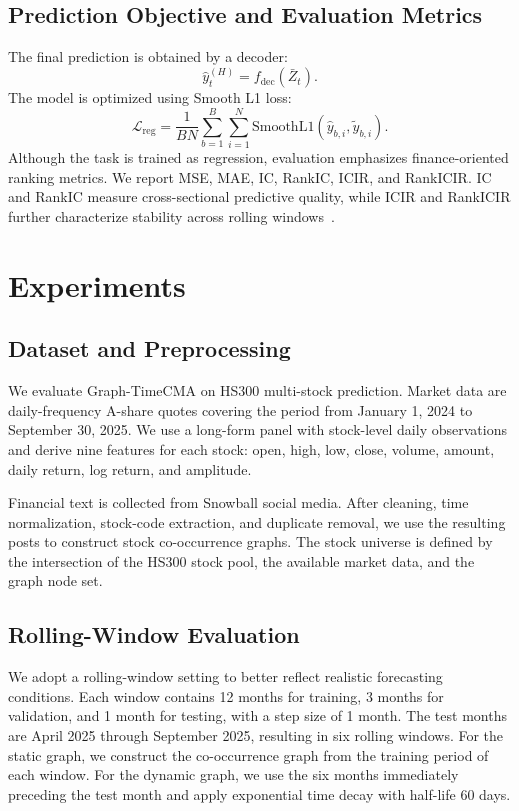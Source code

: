 \documentclass[runningheads]{llncs}
\begin{document}
\subsection{Prediction Objective and Evaluation Metrics}

The final prediction is obtained by a decoder:
\begin{equation}
\hat{y}^{(H)}_t = f_{\text{dec}}(\bar{Z}_t).
\end{equation}
The model is optimized using Smooth L1 loss:
\begin{equation}
\mathcal{L}_{\text{reg}} = \frac{1}{BN} \sum_{b=1}^{B} \sum_{i=1}^{N} \text{SmoothL1}(\hat{y}_{b,i}, \tilde{y}_{b,i}).
\end{equation}
Although the task is trained as regression, evaluation emphasizes finance-oriented ranking metrics. We report MSE, MAE, IC, RankIC, ICIR, and RankICIR. IC and RankIC measure cross-sectional predictive quality, while ICIR and RankICIR further characterize stability across rolling windows~\cite{grinold2000active}.

\section{Experiments}

\subsection{Dataset and Preprocessing}

We evaluate Graph-TimeCMA on HS300 multi-stock prediction. Market data are daily-frequency A-share quotes covering the period from January 1, 2024 to September 30, 2025. We use a long-form panel with stock-level daily observations and derive nine features for each stock: open, high, low, close, volume, amount, daily return, log return, and amplitude.

Financial text is collected from Snowball social media. After cleaning, time normalization, stock-code extraction, and duplicate removal, we use the resulting posts to construct stock co-occurrence graphs. The stock universe is defined by the intersection of the HS300 stock pool, the available market data, and the graph node set.

\subsection{Rolling-Window Evaluation}

We adopt a rolling-window setting to better reflect realistic forecasting conditions. Each window contains 12 months for training, 3 months for validation, and 1 month for testing, with a step size of 1 month. The test months are April 2025 through September 2025, resulting in six rolling windows. For the static graph, we construct the co-occurrence graph from the training period of each window. For the dynamic graph, we use the six months immediately preceding the test month and apply exponential time decay with half-life 60 days.
\end{document}
